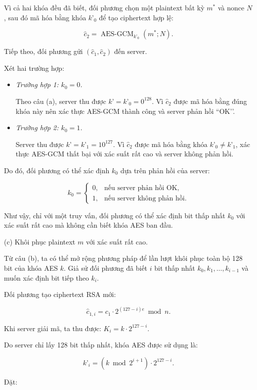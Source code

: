 \begin{loigiai}
Vì cả hai khóa đều đã biết, đối phương chọn một plaintext bất kỳ $m^*$ và nonce $N$, sau đó mã hóa bằng khóa $k’_0$ để tạo ciphertext hợp lệ:

$$
\hat{c}_2=\operatorname{AES\text{-}GCM}_{k’_0}(m^*;N).
$$

Tiếp theo, đối phương gửi $(\hat{c}_1,\hat{c}_2)$ đến server.

Xét hai trường hợp:
\begin{itemize}
    

\item  \textit{Trường hợp 1: $k_0=0$.}

Theo câu (a), server thu được $k’=k’_0=0^{128}$. Vì $\hat{c}_2$ được mã hóa bằng đúng khóa này nên xác thực AES-GCM thành công và server phản hồi ``OK’’.

\item  \textit{Trường hợp 2: $k_0=1$.}

Server thu được $k’=k’_1=10^{127}$. Vì $\hat{c}_2$ được mã hóa bằng khóa $k’_0\neq k’_1$, xác thực AES-GCM thất bại với xác suất rất cao và server không phản hồi.
\end{itemize}
Do đó, đối phương có thể xác định $k_0$ dựa trên phản hồi của server:

$$
\boxed{
k_0=
\begin{cases}
0, & \text{nếu server phản hồi OK},\\
1, & \text{nếu server không phản hồi}.
\end{cases}
}
$$

Như vậy, chỉ với một truy vấn, đối phương có thể xác định bit thấp nhất $k_0$ với xác suất rất cao mà không cần biết khóa AES ban đầu.


\bigskip

{(c) Khôi phục plaintext $m$ với xác suất rất cao.}

Từ câu (b), ta có thể mở rộng phương pháp để lần lượt khôi phục toàn bộ 128 bit của khóa AES $k$. Giả sử đối phương đã biết $i$ bit thấp nhất $k_0,k_1,\ldots,k_{i-1}$ và muốn xác định bit tiếp theo $k_i$.

Đối phương tạo ciphertext RSA mới:

$$
\hat{c}_{1,i}=c_1\cdot 2^{(127-i)e}\bmod n.
$$

Khi server giải mã, ta thu được:
$
K_i=k\cdot 2^{127-i}.
$

Do server chỉ lấy 128 bit thấp nhất, khóa AES được sử dụng là:

$$
\boxed{
k’_i=(k\bmod 2^{i+1})\cdot 2^{127-i}.
}
$$

Đặt:


\end{loigiai}
